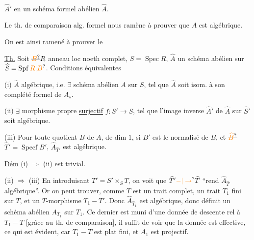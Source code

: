 \\

$\widehat A'$ en un schéma formel abélien $\widehat A$.

Le th. de comparaison alg. formel nous ramène à prouver que $A$ est algébrique.

On est ainsi ramené à prouver le

\uline{Th.} Soit $\deleted{\unsure{B}}R$ anneau loc noeth complet, $S=\operatorname{Spec} R$, $\widehat A$ un schéma  abélien sur $\widehat S=\operatorname{Spf}\unsure{R|B}$. Conditions équivalentes

(i) $\widehat A$ algébrique, i.e. $\exists$ schéma abélien $A$ sur $S$, tel que $\widehat A$ soit isom. à son complété formel  de $A_s$.

(ii) $\exists$ morphisme propre \uline{surjectif}  $f:S'\to S$,  tel que l'image inverse $\widehat A'$ de $\widehat A$ sur $\widehat S'$ soit algébrique.

(iii) Pour toute  quotient   $B$ de $A$, de dim $1$, si $B'$ est le normalisé de $B$, et $\deleted{\unsure{\widehat B}}$ $\widehat T'=\operatorname{Specf} B'$, \unsure{---} $\widehat A_{\widehat T'}$ est algébrique.



\uline{Dém} \quad (i) $\Rightarrow$ (ii) est trivial.

(ii) $\Rightarrow$ (iii) \quad En introduisant $T'=S'\times_S T$, on voit que $\widehat T'\unsure{-|\to}\widehat T$ ``rend $\widehat A_{\widehat T}$ algébrique''. Or on peut trouver, comme $T$ est un trait complet, un  trait $T_1$ fini  sur $T$, et un $T$-morphisme $T_1-T'$. Donc $\widehat A_{\widehat T_1}$ est algébrique, donc définit un schéma abélien $A_{T_1}$ sur $T_1$. Ce dernier est muni d'une donnée de descente rel à $T_1-T$ [grâce au th. de comparaison], il suffit  de voir que la donnée est effective, ce qui est évident, car $T_1-T$ est  plat fini, et $A_{1}$ est projectif.

